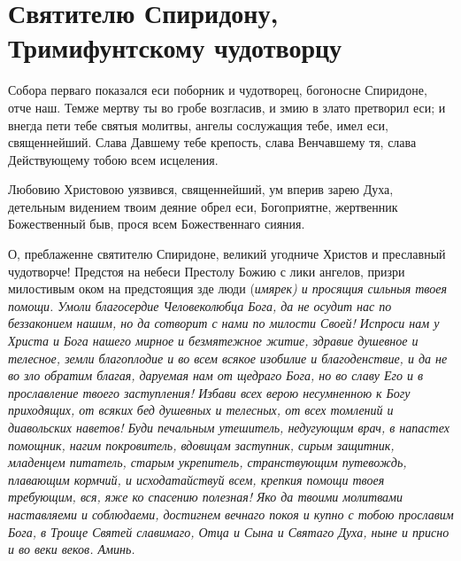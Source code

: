 \section{Святителю Спиридону, Тримифунтскому чудотворцу}\begin{mymulticols}
 


Собора перваго показался еси поборник и чудотворец, богоносне Спиридоне, отче наш. Темже мертву ты во гробе возгласив, и змию в злато претворил еси; и внегда пети тебе святыя молитвы, ангелы сослужащия тебе, имел еси, священнейший. Слава Давшему тебе крепость, слава Венчавшему тя, слава Действующему тобою всем исцеления.


Любовию Христовою уязвився, священнейший, ум вперив зарею Духа, детельным видением твоим деяние обрел еси, Богоприятне, жертвенник Божественный быв, прося всем Божественнаго сияния.


О, преблаженне святителю Спиридоне, великий угодниче Христов и преславный чудотворче! Предстоя на небеси Престолу Божию с лики ангелов, призри милостивым оком на предстоящия зде люди (\itshape имярек\normalfont{}) и просящия сильныя твоея помощи. Умоли благосердие Человеколюбца Бога, да не осудит нас по беззаконием нашим, но да сотворит с нами по милости Своей! Испроси нам у Христа и Бога нашего мирное и безмятежное житие, здравие душевное и телесное, земли благоплодие и во всем всякое изобилие и благоденствие, и да не во зло обратим благая, даруемая нам от щедраго Бога, но во славу Его и в прославление твоего заступления! Избави всех верою несумненною к Богу приходящих, от всяких бед душевных и телесных, от всех томлений и диавольских наветов! Буди печальным утешитель, недугующим врач, в напастех помощник, нагим покровитель, вдовицам заступник, сирым защитник, младенцем питатель, старым укрепитель, странствующим путевождь, плавающим кормчий, и исходатайствуй всем, крепкия помощи твоея требующим, вся, яже ко спасению полезная! Яко да твоими молитвами наставляеми и соблюдаеми, достигнем вечнаго покоя и купно с тобою прославим Бога, в Троице Святей славимаго, Отца и Сына и Святаго Духа, ныне и присно и во веки веков. Аминь.

\end{mymulticols}\newpage

